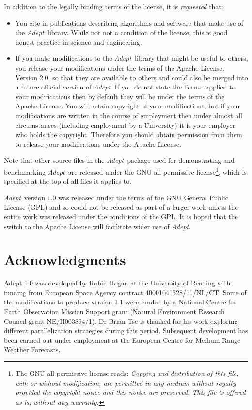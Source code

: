 \documentclass[a4,oneside]{book}
\def\Adept{\emph{Adept}}
\begin{document}
In addition to the legally binding terms of the license, it is
\emph{requested} that:
\begin{itemize}
\item You cite \cite{Hogan2014} in publications describing algorithms
  and software that make use of the \Adept\ library. While not not a
  condition of the license, this is good honest practice in science
  and engineering.
\item If you make modifications to the \Adept\ library that might be
  useful to others, you release your modifications under the terms of
  the Apache License, Version 2.0, so that they are available to
  others and could also be merged into a future official version of
  \Adept. If you do not state the license applied to your
  modifications then by default they will be under the terms of the
  Apache License. You will retain copyright of your modifications, but
  if your modifications are written in the course of employment then
  under almost all circumstances (including employment by a
  University) it is your employer who holds the copyright.  Therefore
  you should obtain permission from them to release your modifications
  under the Apache License.
\end{itemize}

Note that other source files in the \Adept\ package used for
demonstrating and benchmarking \Adept\ are released under the GNU
all-permissive license\footnote{The GNU all-permissive license reads:
  \emph{Copying and distribution of this file, with or without
    modification, are permitted in any medium without royalty provided
    the copyright notice and this notice are preserved.  This file is
    offered as-is, without any warranty.}}, which is specified at the
top of all files it applies to.

\Adept\ version 1.0 was released under the terms of the GNU General
Public License (GPL) and so could not be released as part of a larger
work unless the entire work was released under the conditions of the
GPL.  It is hoped that the switch to the Apache License will
facilitate wider use of \Adept.

\section*{Acknowledgments}
Adept 1.0 was developed by Robin Hogan at the University of Reading
with funding from European Space Agency contract
40001041528/11/NL/CT. Some of the modifications to produce version 1.1
were funded by a National Centre for Earth Observation Mission Support
grant (Natural Environment Research Council grant NE/H003894/1). Dr
Brian Tse is thanked for his work exploring different parallelization
strategies during this period. Subsequent development has been carried
out under employment at the European Centre for Medium Range Weather
Forecasts.
\end{document}

